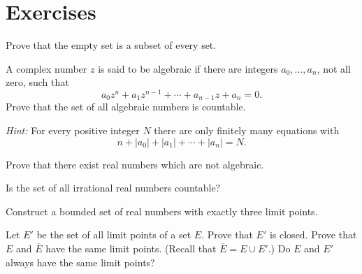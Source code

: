 
\section{Exercises}

\begin{myExercise}
    \label{ex:2.1}
    Prove that the empty set is a subset of every set.
\end{myExercise}

\begin{myExercise}
    \label{ex:2.2}
    A complex number $z$ is said to be algebraic 
    if there are integers $a_0, ... , a_n$, not all
    zero, such that
    \begin{equation*}
        a_{0} z^{n} 
        + a_{1} z^{n-1}
        +\cdots
        + a_{n-1} z
        + a_n = 0 .
    \end{equation*}
    Prove that the set of all algebraic numbers is countable. 
    
    \emph{Hint:} For every positive integer $N$ 
    there are only finitely many equations with
    \begin{equation*}
        n 
        + |a_0|
        + |a_1|
        + \cdots
        + |a_n| = N .
    \end{equation*}
\end{myExercise}

\begin{myExercise}
    \label{ex:2.3}
    Prove that there exist real numbers which are not algebraic.
\end{myExercise}

\begin{myExercise}
    \label{ex:2.4}
    Is the set of all irrational real numbers countable?
\end{myExercise}

\begin{myExercise}
    \label{ex:2.5}
    Construct a bounded set of real numbers with exactly three limit points.
\end{myExercise}

\begin{myExercise}
    \label{ex:2.6}
    Let $E'$ be the set of all limit points of a set $E$. 
    Prove that $E'$ is closed. 
    Prove that $E$ and $\overline{E}$ have the same limit points. 
    (Recall that $\overline{E} = E \cup E'$.) 
    Do $E$ and $E'$ always have the same limit points?
\end{myExercise}

